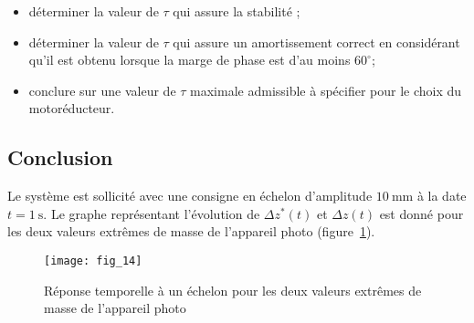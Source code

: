\ifprof
\begin{corrige}
\end{corrige}
\else
\fi

\begin{itemize}
  \item déterminer la valeur de $\tau$ qui assure la stabilité ;
  \item déterminer la valeur de $\tau$ qui assure un amortissement correct en considérant qu'il est obtenu lorsque la marge de phase est d'au moins $60^{\circ}$;
\item conclure sur une valeur de $\tau$ maximale admissible à spécifier pour le choix du motoréducteur.
\end{itemize}
\ifprof
\begin{corrige}
\end{corrige}
\else
\fi


\subsection{Conclusion}
Le système est sollicité avec une consigne en échelon d'amplitude $10 \mathrm{~mm}$ à la date $t=1 \mathrm{~s}$. Le graphe représentant l'évolution de $\Delta z^{*}(t)$ et $\Delta z(t)$ est donné pour les deux valeurs extrêmes de masse de l'appareil photo (figure~\ref{fig:14}).

\begin{figure}[H]
\centering
\texttt{[image: fig\_14]}
\caption{\label{fig:14}  Réponse temporelle à un échelon pour les deux valeurs extrêmes de masse de l'appareil photo}
\end{figure}

\ifprof
\begin{corrige}
\end{corrige}
\else
\fi

